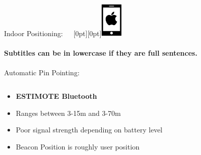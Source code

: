 \documentclass[11pt]{beamer}
\begin{document}
\begin{frame}{Indoor Positioning:~~~\raisebox{-10pt}[0pt][0pt]{\includegraphics[width=0.08\textwidth]{tech-stack-apple}}}

\framesubtitle{Subtitles can be in lowercase if they are full sentences.}
Automatic Pin Pointing:

  \begin{columns}[T]
  \begin{column}{.6\textwidth}
  \begin{itemize}
  \item  \textbf{ESTIMOTE Bluetooth} \\
  \item Ranges between 3-15m and 3-70m
  \item Poor signal strength depending on battery level
  \item Beacon Position is roughly user position
  \end{itemize}
  \end{column}
  \begin{column}{.4\textwidth}

\end{column}
\end{columns}
\end{frame}
\end{document}
